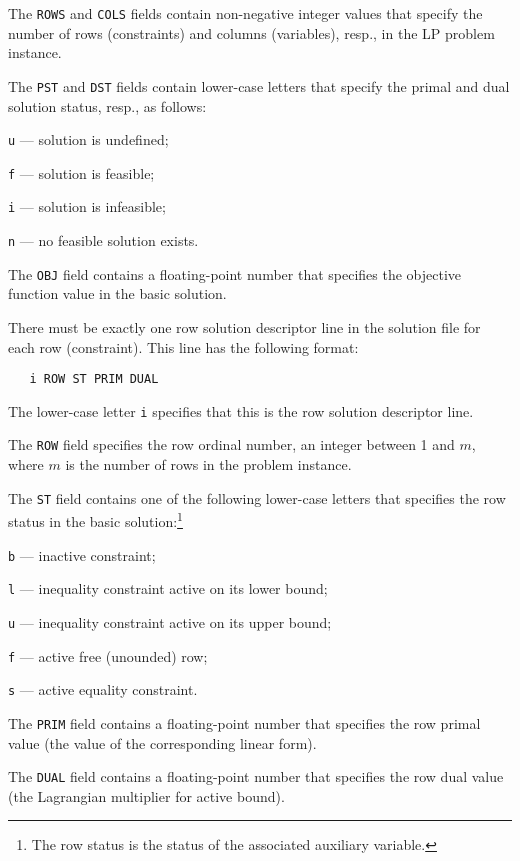 The \verb|ROWS| and \verb|COLS| fields contain non-negative integer
values that specify the number of rows (constraints) and columns
(variables), resp., in the LP problem instance.

The \verb|PST| and \verb|DST| fields contain lower-case letters that
specify the primal and dual solution status, resp., as follows:

\verb|u| --- solution is undefined;

\verb|f| --- solution is feasible;

\verb|i| --- solution is infeasible;

\verb|n| --- no feasible solution exists.

The \verb|OBJ| field contains a floating-point number that specifies
the objective function value in the basic solution.

 There must be exactly one row solution
descriptor line in the solution file for each row (constraint). This
line has the following format:

\begin{verbatim}
   i ROW ST PRIM DUAL
\end{verbatim}

The lower-case letter \verb|i| specifies that this is the row solution
descriptor line.

The \verb|ROW| field specifies the row ordinal number, an integer
between 1 and $m$, where $m$ is the number of rows in the problem
instance.

The \verb|ST| field contains one of the following lower-case letters
that specifies the row status in the basic solution:\footnote{The row
status is the status of the associated auxiliary variable.}

\verb|b| --- inactive constraint;

\verb|l| --- inequality constraint active on its lower bound;

\verb|u| --- inequality constraint active on its upper bound;

\verb|f| --- active free (unounded) row;

\verb|s| --- active equality constraint.

The \verb|PRIM| field contains a floating-point number that specifies
the row primal value (the value of the corresponding linear form).

The \verb|DUAL| field contains a floating-point number that specifies
the row dual value (the Lagrangian multiplier for active bound).

